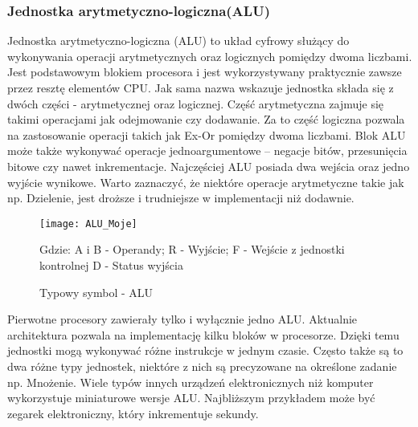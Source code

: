 \documentclass[12pt, a4paper, onside, polish]{article}				%
\begin{document}
\subsubsection{Jednostka arytmetyczno-logiczna(ALU)}
\hspace{\parindent}
	Jednostka arytmetyczno-logiczna (ALU) to układ cyfrowy służący do wykonywania operacji arytmetycznych oraz logicznych pomiędzy dwoma liczbami. Jest podstawowym blokiem procesora i jest wykorzystywany praktycznie zawsze przez resztę elementów CPU. Jak sama nazwa wskazuje jednostka składa się z dwóch części - arytmetycznej oraz logicznej. Część arytmetyczna zajmuje się takimi operacjami jak odejmowanie czy dodawanie. Za to część logiczna pozwala na zastosowanie operacji takich jak Ex-Or pomiędzy dwoma liczbami. Blok ALU może także wykonywać operacje jednoargumentowe – negacje bitów, przesunięcia bitowe czy nawet inkrementacje. Najczęściej ALU posiada dwa wejścia oraz jedno wyjście wynikowe. Warto zaznaczyć, że niektóre operacje arytmetyczne takie jak np. Dzielenie, jest droższe i trudniejsze w implementacji niż dodawnie. 

\begin{figure}[hbt!]
{\centering \texttt{[image: ALU\_Moje]} \caption{Typowy symbol - ALU}}\vspace{5mm}
Gdzie:\newline
A i B - Operandy;\newline
R - Wyjście;\newline
F - Wejście z jednostki kontrolnej\newline
D - Status wyjścia\newline
\end{figure}

	Pierwotne procesory zawierały tylko i wyłącznie jedno ALU. Aktualnie architektura pozwala na implementację kilku bloków w procesorze. Dzięki temu jednostki mogą wykonywać różne instrukcje w jednym czasie. Często także są to dwa różne typy jednostek, niektóre z nich są precyzowane na określone zadanie np. Mnożenie. Wiele typów innych urządzeń elektronicznych niż komputer wykorzystuje miniaturowe wersje ALU. Najbliższym przykładem może być zegarek elektroniczny, który inkrementuje sekundy.  
\end{document}
